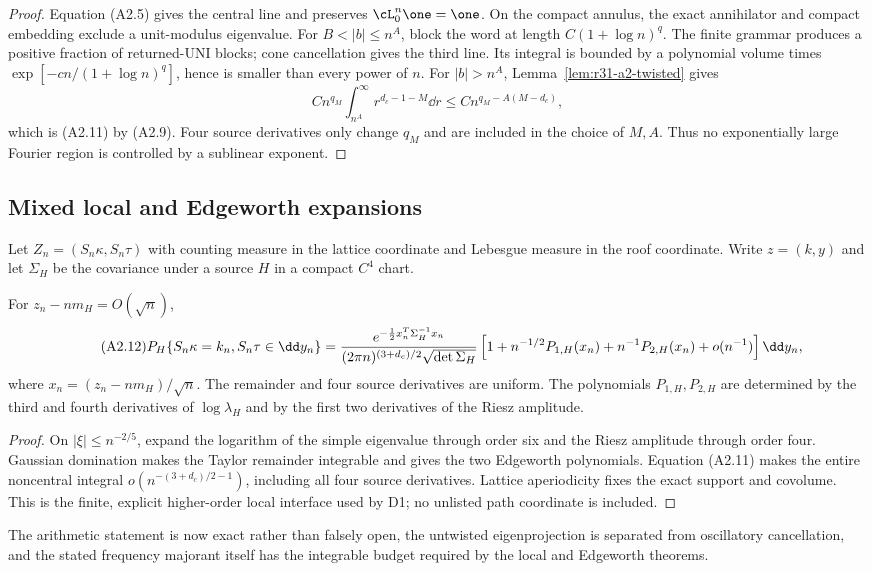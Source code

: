 \begin{proof}
Equation (A2.5) gives the central line and preserves
$\cL_0^n\one=\one$.  On the compact annulus, the exact annihilator and compact
embedding exclude a unit-modulus eigenvalue.  For $B<|b|\le n^A$, block the
word at length $C(1+\log n)^q$.  The finite grammar produces a positive
fraction of returned-UNI blocks; cone cancellation gives the third line.
Its integral is bounded by a polynomial volume times
$\exp[-cn/(1+\log n)^q]$, hence is smaller than every power of $n$.
For $|b|>n^A$, Lemma~\ref{lem:r31-a2-twisted} gives
\[
 Cn^{q_M}\int_{n^A}^\infty r^{d_c-1-M}\dd r
 \le Cn^{q_M-A(M-d_c)},
\]
which is (A2.11) by (A2.9).  Four source derivatives only change $q_M$ and
are included in the choice of $M,A$.  Thus no exponentially large Fourier
region is controlled by a sublinear exponent.
\end{proof}

\subsection{Mixed local and Edgeworth expansions}

Let $Z_n=(S_n\kappa,S_n\tau)$ with counting measure in the lattice coordinate
and Lebesgue measure in the roof coordinate.  Write $z=(k,y)$ and let
$\Sigma_H$ be the covariance under a source $H$ in a compact $C^4$ chart.

\begin{theorem}
\label{thm:r31-a2-edgeworth}
For $z_n-nm_H=O(\sqrt n)$,
\begin{equation}\tag{A2.12}
 P_H\{S_n\kappa=k_n,S_n\tau\in\dd y_n\}
 ={e^{-\frac12x_n^T\Sigma_H^{-1}x_n}
   \over(2\pi n)^{(3+d_c)/2}\sqrt{\det\Sigma_H}}
 \left[1+n^{-1/2}P_{1,H}(x_n)+n^{-1}P_{2,H}(x_n)
       +o(n^{-1})\right]\dd y_n,
\end{equation}
where $x_n=(z_n-nm_H)/\sqrt n$.  The remainder and four source derivatives
are uniform.  The polynomials $P_{1,H},P_{2,H}$ are determined by the third
and fourth derivatives of $\log\lambda_H$ and by the first two derivatives of
the Riesz amplitude.
\end{theorem}

\begin{proof}
On $|\xi|\le n^{-2/5}$, expand the logarithm of the simple eigenvalue through
order six and the Riesz amplitude through order four.  Gaussian domination
makes the Taylor remainder integrable and gives the two Edgeworth
polynomials.  Equation (A2.11) makes the entire noncentral integral
$o(n^{-(3+d_c)/2-1})$, including all four source derivatives.  Lattice
aperiodicity fixes the exact support and covolume.  This is the finite,
explicit higher-order local interface used by D1; no unlisted path coordinate
is included.
\end{proof}

The arithmetic statement is now exact rather than falsely open, the
untwisted eigenprojection is separated from oscillatory cancellation, and the
stated frequency majorant itself has the integrable budget required by the
local and Edgeworth theorems.
